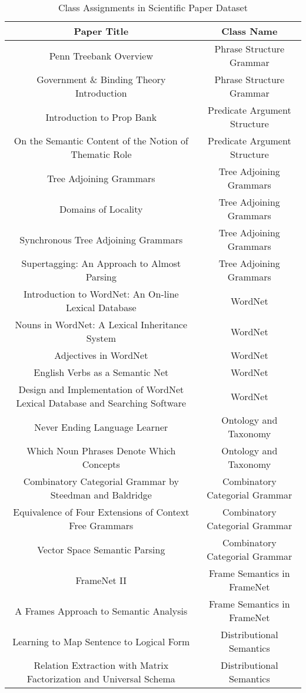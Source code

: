 \documentclass[11pt]{article}
\newcommand{\headcol}{\rowcolor{tableheadcolor}} %
\begin{document}
\begin{table}
\centering
\footnotesize
\caption{Class Assignments in Scientific Paper Dataset}
\label{tbl:ScientificPaperClassListing}
\begin{tabular}{|c|c|}
\headcol \color{white} Paper Title & \color{white} Class Name \\
\hline
Penn Treebank Overview & Phrase Structure Grammar \\
Government \& Binding Theory Introduction & Phrase Structure Grammar \\ 
Introduction to Prop Bank & Predicate Argument Structure \\ 
On the Semantic Content of the Notion of Thematic Role & Predicate Argument Structure \\
Tree Adjoining Grammars & Tree Adjoining Grammars \\
Domains of Locality & Tree Adjoining Grammars \\
Synchronous Tree Adjoining Grammars & Tree Adjoining Grammars \\
Supertagging: An Approach to Almost Parsing & Tree Adjoining Grammars \\
Introduction to WordNet: An On-line Lexical Database & WordNet \\
Nouns in WordNet: A Lexical Inheritance System & WordNet \\
Adjectives in WordNet & WordNet \\
English Verbs as a Semantic Net & WordNet \\
Design and Implementation of WordNet Lexical Database and Searching Software & WordNet \\
Never Ending Language Learner & Ontology and Taxonomy \\
Which Noun Phrases Denote Which Concepts & Ontology and Taxonomy \\
Combinatory Categorial Grammar by Steedman and Baldridge & Combinatory Categorial Grammar \\
Equivalence of Four Extensions of Context Free Grammars & Combinatory Categorial Grammar \\
Vector Space Semantic Parsing & Combinatory Categorial Grammar \\
FrameNet II & Frame Semantics in FrameNet \\
A Frames Approach to Semantic Analysis & Frame Semantics in FrameNet \\
Learning to Map Sentence to Logical Form & Distributional Semantics \\
Relation Extraction with Matrix Factorization and Universal Schema & Distributional Semantics \\
\hline
\end{tabular}
\end{table}
\end{document}
